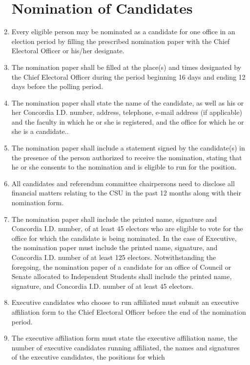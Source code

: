 \documentclass[oneside]{book}
\begin{document}
\begin{enumerate}
\section{\label{Nomination_of_Candidates}Nomination of Candidates }
\item Every eligible person may be nominated as a candidate for one office
in an election period by filling the prescribed nomination paper with
the Chief Electoral Officer or his/her designate. 
\item The nomination paper shall be filled at the place(s) and times designated
by the Chief Electoral Officer during the period beginning 16 days
and ending 12 days before the polling period. 
\item The nomination paper shall state the name of the candidate, as well
as his or her Concordia I.D. number, address, telephone, e-mail address
(if applicable) and the faculty in which he or she is registered,
and the office for which he or she is a candidate.. 
\item The nomination paper shall include a statement signed by the candidate(s)
in the presence of the person authorized to receive the nomination,
stating that he or she consents to the nomination and is eligible
to run for the position. 
\item All candidates and referendum committee chairpersons need to disclose
all financial matters relating to the CSU in the past 12 months along
with their nomination form. 
\item \label{enu:nomination-paper}The nomination paper shall include the
printed name, signature and Concordia I.D. number, of at least 45
electors who are eligible to vote for the office for which the candidate
is being nominated. In the case of Executive, the nomination paper
must include the printed name, signature, and Concordia I.D. number
of at least 125 electors. Notwithstanding the foregoing, the nomination
paper of a candidate for an office of Council or Senate allocated
to Independent Students shall include the printed name, signature,
and Concordia I.D. number of at least 45 electors. 
\item Executive candidates who choose to run affiliated must submit an executive
affiliation form to the Chief Electoral Officer before the end of
the nomination period. 
\item The executive affiliation form must state the executive affiliation
name, the number of executive candidates running affiliated, the names
and signatures of the executive candidates, the positions for which

\end{enumerate}
\end{document}
